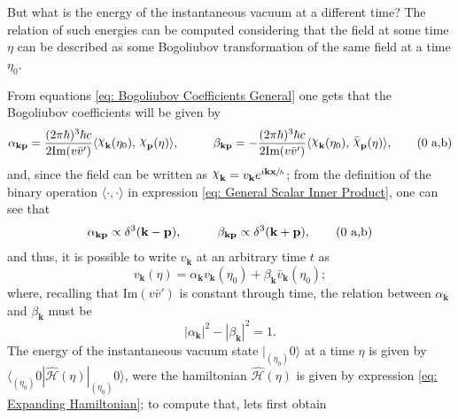\vspace*{0.5cm}

But what is the energy of the instantaneous vacuum at a different time? The relation of such energies can be computed considering that the field at some time $\eta$ can be described as some Bogoliubov transformation of the same field at a time $\eta_0$.

From equations \ref{eq: Bogoliubov Coefficients General} one gets that the Bogoliubov coefficients will be given by
\begin{subequations}
	\begin{gather}
		\alpha_{\mathbf{kp}}=\frac{(2\pi\hbar)^3\hbar c}{2\text{Im}(v\bar v')}\langle \rchi_\mathbf{k}(\eta_0),\,\rchi_\mathbf{p}(\eta)\rangle,\hspace{1.0cm}\beta_{\mathbf{kp}}=-\frac{(2\pi\hbar)^3\hbar c}{2\text{Im}(v\bar v')}\langle \rchi_\mathbf{k}(\eta_0),\,\bar \rchi_\mathbf{p}(\eta)\rangle,\tag{\theequation \,\,a,b}
	\end{gather}
\end{subequations}
and, since the field can be written as $\rchi_\mathbf{k}=v_\mathbf{k}e^{i\mathbf{kx}\sfrac{}{h}}$; from the definition of the binary operation $\langle\cdot,\cdot\rangle$ in expression \ref{eq: General Scalar Inner Product}, one can see that
\begin{subequations}
	\begin{gather}
		\alpha_{\mathbf{kp}}\propto \delta^3(\mathbf{k}-\mathbf{p}),\hspace{1.0cm}\beta_{\mathbf{kp}}\propto \delta^3(\mathbf{k}+\mathbf{p}),\tag{\theequation \,\,a,b}
	\end{gather}
\end{subequations}
and thus, it is possible to write $v_\mathbf{k}$ at an arbitrary time $t$ as
\begin{equation}
	v_\mathbf{k}(\eta)=\alpha_\mathbf{k}v_\mathbf{k}(\eta_0)+\beta_\mathbf{k}\bar v_\mathbf{k}(\eta_0);
\end{equation}
where, recalling that $\text{Im}(v\bar v')$ is constant through time, the relation between $\alpha_\mathbf{k}$ and $\beta_\mathbf{k}$ must be
\begin{equation}\label{eq: Bogoliubov coefficients relation Expanding}
	|\alpha_\mathbf{k}|^2-|\beta_\mathbf{k}|^2=1.
\end{equation}
The energy of the instantaneous vacuum state $|_{(\eta_0)}0\rangle$ at a time $\eta$ is given by $\langle_{(\eta_0)}0|\hat{\mathcal{H}}(\eta)|_{(\eta_0)}0\rangle$, were the hamiltonian $\hat{\mathcal{H}}(\eta)$ is given by expression \ref{eq: Expanding Hamiltonian}; to compute that, lets first obtain


